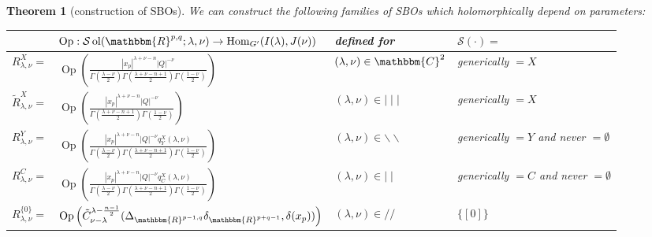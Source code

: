 \documentclass[10pt]{article} %
\newcommand{\tmop}[1]{\ensuremath{\operatorname{#1}}}
\newtheorem{theorem}{Theorem}
\theoremstyle{definition}
\begin{document}
\begin{theorem}[construction of SBOs]\label{thm:construction}
We can construct the following families of SBOs which holomorphically depend on parameters:\\
\begin{tabular}{|l|l|l|l|}
  \hline
  & $\tmop{Op} : \mathcal{S} \tmop{ol} (\mathbbm{R}^{p, q} ; \lambda, \nu)
  \rightarrow \tmop{Hom}_{G'} (I (\lambda), J (\nu))$ & defined for &
  $\mathcal{S} (\cdot) =$\\
  \hline
  $R_{\lambda, \nu}^X =$ & $\tmop{Op} \left( \frac{| x_p |^{\lambda + \nu - n}
  | Q |^{- \nu}}{\Gamma \left( \frac{\lambda - \nu}{2} \right) \Gamma \left(
  \frac{\lambda + \nu - n + 1}{2} \right) \Gamma \left( \frac{1 - \nu}{2}
  \right)} \right)$ & $(\lambda, \nu) \in \mathbbm{C}^2$ & generically $=X$\\
  \hline
  $\tilde{R}^X_{\lambda, \nu} =$ & $\tmop{Op} \left( \frac{| x_p |^{\lambda +
  \nu - n} | Q |^{- \nu}}{\Gamma \left( \frac{\lambda + \nu - n + 1}{2}
  \right) \Gamma \left( \frac{1 - \nu}{2} \right)} \right)$ & $(\lambda, \nu)
  \in \mid \mid \mid$ & generically $=X$\\
  \hline
  $R_{\lambda, \nu}^Y =$ & $\tmop{Op} \left( \frac{| x_p |^{\lambda + \nu - n}
  | Q |^{- \nu} q_Y^X (\lambda, \nu)}{\Gamma \left( \frac{\lambda - \nu}{2}
  \right) \Gamma \left( \frac{\lambda + \nu - n + 1}{2} \right) \Gamma \left(
  \frac{1 - \nu}{2} \right)} \right)$ & $(\lambda, \nu) \in
  \backslash\backslash$ & generically $=Y$ and never $=\emptyset$\\
  \hline
  $R_{\lambda, \nu}^C =$ & $\tmop{Op} \left( \frac{| x_p |^{\lambda + \nu - n}
  | Q |^{- \nu} q_C^X (\lambda, \nu)}{\Gamma \left( \frac{\lambda - \nu}{2}
  \right) \Gamma \left( \frac{\lambda + \nu - n + 1}{2} \right) \Gamma \left(
  \frac{1 - \nu}{2} \right)} \right)$ & $(\lambda, \nu) \in \mid \mid$ &
  generically $=C$ and never $=\emptyset$\\
  \hline
  $R_{\lambda, \nu}^{\{ 0 \}} =$ & $\tmop{Op} \left( \tilde{C}_{\nu -
  \lambda}^{\lambda - \frac{n - 1}{2}} (\Delta_{\mathbbm{R}^{p - 1, q}}
  \delta_{\mathbbm{R}^{p + q - 1}}, \delta (x_p)) \right)$ & $(\lambda, \nu)
  \in / /$ & $\{ [0] \}$\\
  \hline
\end{tabular}


\end{theorem}
\end{document}
